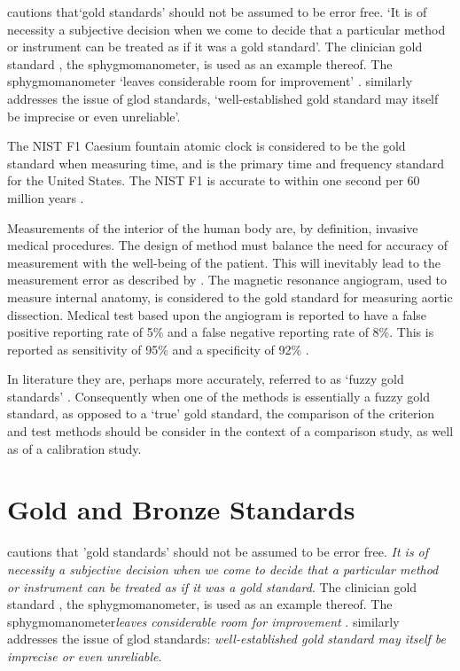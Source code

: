 \documentclass[Chap1bmain.tex]{subfiles}
\begin{document}
\citet[p.47]{DunnSEME} cautions that`gold standards' should not be
assumed to be error free. `It is of necessity a subjective
decision when we come to decide that a particular method or
instrument can be treated as if it was a gold standard'. The
clinician gold standard , the sphygmomanometer, is used as an
example thereof.  The sphygmomanometer `leaves considerable room
for improvement' \citep{DunnSEME}. \citet{pizzi} similarly
addresses the issue of glod standards, `well-established gold
standard may itself be imprecise or even unreliable'.


The NIST F1 Caesium fountain atomic clock is considered to be the
gold standard when measuring time, and is the primary time and
frequency standard for the United States. The NIST F1 is accurate
to within one second per 60 million years \citep{NIST}.

Measurements of the interior of the human body are, by definition,
invasive medical procedures. The design of method must balance the
need for accuracy of measurement with the well-being of the
patient. This will inevitably lead to the measurement error as
described by \citet{DunnSEME}. The magnetic resonance angiogram,
used to measure internal anatomy,  is considered to the gold
standard for measuring aortic dissection. Medical test based upon
the angiogram is reported to have a false positive reporting rate
of 5\% and a false negative reporting rate of 8\%. This is
reported as sensitivity of 95\% and a specificity of 92\%
\citep{ACR}.

In literature they are, perhaps more accurately, referred to as
`fuzzy gold standards' \citep{phelps}. Consequently when one of the methods is
essentially a fuzzy gold standard, as opposed to a `true' gold
standard, the comparison of the criterion and test methods should
be consider in the context of a comparison study, as well as of a
calibration study.

\section{Gold and Bronze Standards}

\noindent \citet[p.47]{DunnSEME} cautions that 'gold standards' should not be assumed to be error free. \emph{It is of necessity a subjective decision when we come to decide that a particular method or instrument can be treated as if it was a gold standard}.
The clinician gold standard , the sphygmomanometer, is used as an example thereof.  The sphygmomanometer\emph{leaves considerable room for improvement} \citep{DunnSEME}. \citet{pizzi} similarly addresses the issue of glod standards: \emph{well-established gold standard may itself be imprecise or even unreliable}.
\end{document}
